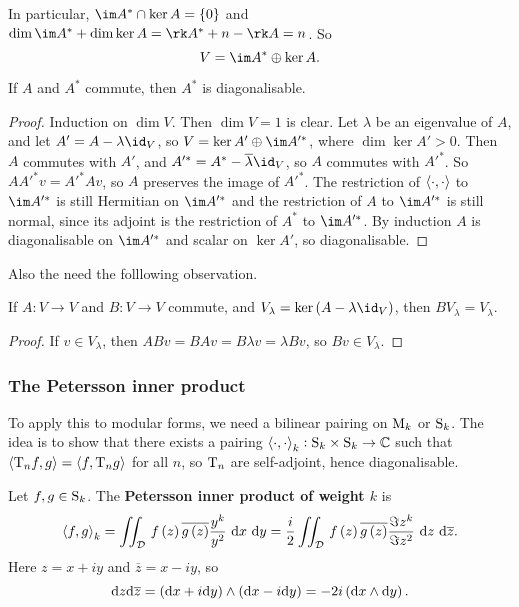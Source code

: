 In particular, $ \im A^* \cap \ker A = \cbr{0} $ and $ \dim \im A^* + \dim \ker A = \rk A^* + n - \rk A = n $. So
$$ V = \im A^* \oplus \ker A. $$

\begin{theorem}
If $ A $ and $ A^* $ commute, then $ A^* $ is diagonalisable.
\end{theorem}

\begin{proof}
Induction on $ \dim V $. Then $ \dim V = 1 $ is clear. Let $ \lambda $ be an eigenvalue of $ A $, and let $ A' = A - \lambda\id_V $, so $ V = \ker A' \oplus \im A'^* $, where $ \dim \ker A' > 0 $. Then $ A $ commutes with $ A' $, and $ A'^* = A^* - \overline{\lambda}\id_V $, so $ A $ commutes with $ A'^* $. So $ AA'^*v = A'^*Av $, so $ A $ preserves the image of $ A'^* $. The restriction of $ \abr{\cdot, \cdot} $ to $ \im A'^* $ is still Hermitian on $ \im A'^* $ and the restriction of $ A $ to $ \im A'^* $ is still normal, since its adjoint is the restriction of $ A^* $ to $ \im A'^* $. By induction $ A $ is diagonalisable on $ \im A'^* $ and scalar on $ \ker A' $, so diagonalisable.
\end{proof}

Also the need the folllowing observation.

\begin{proposition}
If $ A : V \to V $ and $ B : V \to V $ commute, and $ V_\lambda = \ker \br{A - \lambda\id_V} $, then $ BV_\lambda = V_\lambda $.
\end{proposition}

\begin{proof}
If $ v \in V_\lambda $, then $ ABv = BAv = B\lambda v = \lambda Bv $, so $ Bv \in V_\lambda $.
\end{proof}

\pagebreak

\subsubsection{The Petersson inner product}

To apply this to modular forms, we need a bilinear pairing on $ \M_k $ or $ \S_k $. The idea is to show that there exists a pairing $ \abr{\cdot, \cdot}_k : \S_k \times \S_k \to \CC $ such that $ \abr{\T_nf, g} = \abr{f, \T_ng} $ for all $ n $, so $ \T_n $ are self-adjoint, hence diagonalisable.

\begin{definition}
Let $ f, g \in \S_k $. The \textbf{Petersson inner product of weight $ k $} is
$$ \abr{f, g}_k = \iintd{\DDD}{f\br{z}\overline{g\br{z}}\dfrac{y^k}{y^2}}{x}{y} = \dfrac{i}{2}\iintd{\DDD}{f\br{z}\overline{g\br{z}}\dfrac{\Im z^k}{\Im z^2}}{z}{\overline{z}}. $$
Here $ z = x + iy $ and $ \overline{z} = x - iy $, so
$$ \d z\d\overline{z} = \br{\d x + i\d y} \wedge \br{\d x - i\d y} = -2i\br{\d x \wedge \d y}. $$
\end{definition}

